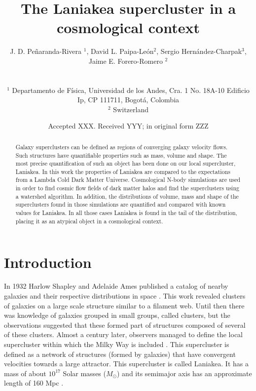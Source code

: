 \documentclass[usenatbib]{mnras}
\title[Laniakea in context]{The Laniakea supercluster in a cosmological context}
\author[Barrera et al.]{
\parbox[t]{\textwidth}{
    {J. D. Pe\~naranda-Rivera $^1$,} 
    {David L.  Paipa-Le\'on$^{2}$,}
    {Sergio Hern\'andez-Charpak$^3$,}\\
    {Jaime E. Forero-Romero $^{2}$}
}
\\\\
$^{1}$ Departamento de F\'isica, Universidad de los Andes, Cra. 1
  No. 18A-10 Edificio Ip, CP 111711, Bogot\'a, Colombia \\
$^{2}$ Switzerland\\
}
\date{Accepted XXX. Received YYY; in original form ZZZ}
\begin{document}
\label{firstpage}
\pagerange{\pageref{firstpage}--\pageref{lastpage}}
\maketitle

\maketitle
\begin{abstract}
Galaxy superclusters can be defined as regions of converging galaxy velocity flows.
Such structures have quantifiable properties such as mass, volume and shape.
The most precise quantification of such an object has been done on our local supercluster, Laniakea. 
In this work the properties of Laniakea are compared to the expectations from a Lambda Cold Dark Matter Universe.
Cosmological N-body simulations are used in order to find cosmic flow fields of dark matter halos and find the superclusters using a watershed algorithm.
In addition, the distributions of volume, mass and shape of the superclusters found in those simulations are quantified and compared with known values for Laniakea.
In all those cases Laniakea is found in the tail of the distribution, placing it as an atypical object in a cosmological context. 
\end{abstract}

\begin{keywords}
\end{keywords}




\section{Introduction}


In 1932 Harlow Shapley and Adelaide Ames published a catalog of nearby galaxies and their respective distributions in space \citep{catalogoRevisado}.  This work revealed clusters of galaxies on a large scale structure similar to a filament web. Until then there was knowledge of galaxies grouped in small groups, called clusters, but the observations suggested that these formed part of structures composed of several of these clusters. Almost a century later, observers managed to define the local supercluster within which the Milky Way is included \citep{tully_laniakea_2014}. 
This supercluster is defined as a network of structures (formed by galaxies) that have convergent velocities towards a large attractor. This supercluster is called Laniakea. It has a mass of about $10^{17}$ Solar masses ($M_{\odot}$) and its semimajor axis has an approximate length of 160 Mpc \cite{NatureTully}.
\end{document}
